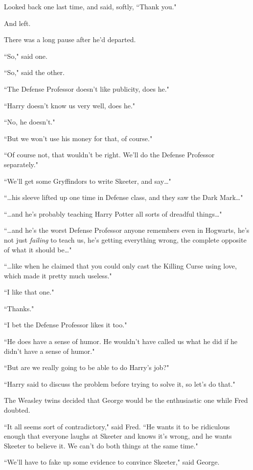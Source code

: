 Looked back one last time, and said, softly, ``Thank you."

And left.

There was a long pause after he'd departed.

``So," said one.

``So," said the other.

``The Defense Professor doesn't like publicity, does he."

``Harry doesn't know us very well, does he."

``No, he doesn't."

``But we won't use his money for that, of course."

``Of course not, that wouldn't be right. We'll do the Defense Professor separately."

``We'll get some Gryffindors to write Skeeter, and say{\ldots}"

``{\ldots}his sleeve lifted up one time in Defense class, and they saw the Dark Mark{\ldots}"

``{\ldots}and he's probably teaching Harry Potter all sorts of dreadful things{\ldots}"

``{\ldots}and he's the worst Defense Professor anyone remembers even in Hogwarts, he's not just \emph{failing} to teach us, he's getting everything wrong, the complete opposite of what it should be{\ldots}"

``{\ldots}like when he claimed that you could only cast the Killing Curse using love, which made it pretty much useless."

``I like that one."

``Thanks."

``I bet the Defense Professor likes it too."

``He does have a sense of humor. He wouldn't have called us what he did if he didn't have a sense of humor."

``But are we really going to be able to do Harry's job?"

``Harry said to discuss the problem before trying to solve it, so let's do that."

The Weasley twins decided that George would be the enthusiastic one while Fred doubted.

``It all seems sort of contradictory," said Fred. ``He wants it to be ridiculous enough that everyone laughs at Skeeter and knows it's wrong, and he wants Skeeter to believe it. We can't do both things at the same time."

``We'll have to fake up some evidence to convince Skeeter," said George.

